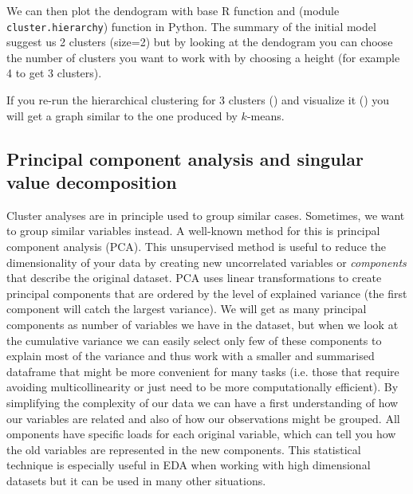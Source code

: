 We can then plot the dendogram  with base R function  and  (module \texttt{cluster.hierarchy}) function  in Python. The summary of the initial model suggest us 2 clusters (size=2) but by looking at the dendogram you can choose the number of clusters you want to work with by choosing a height (for example 4 to get 3 clusters). 


If you re-run the hierarchical clustering for 3 clusters () and visualize it () you will get a graph similar to the one produced by $k$-means.




\subsection{Principal component analysis and singular value decomposition}

Cluster analyses are in principle used to group similar
cases. Sometimes, we want to group similar variables instead.  A
well-known method for this is principal component analysis (PCA). This
unsupervised method is useful to reduce the dimensionality of your
data by creating new uncorrelated variables or \textit{components}
that describe the original dataset. PCA uses linear transformations to
create principal components that are ordered by the level of explained
variance (the first component will catch the largest variance). We
will get as many principal components as number of variables we have
in the dataset, but when we look at the cumulative variance we can
easily select only few of these components to explain most of the
variance and thus work with a smaller and summarised dataframe that
might be more convenient for many tasks (i.e. those that require
avoiding multicollinearity or just need to be more computationally
efficient). By simplifying the complexity of our data we can have a
first understanding of how our variables are related and also of how
our observations might be grouped. All omponents have specific loads
for each original variable, which can tell you how the old variables
are represented in the new components. This statistical technique is
especially useful in EDA when working with high dimensional datasets
but it can be used in many other situations.

